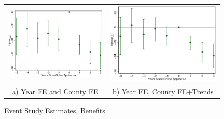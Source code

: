 \documentclass[11pt,letterpaper]{article}
\begin{document}
\begin{figure}\caption{Event Study Estimates, Benefits}
\begin{tabular}{cc}
\includegraphics[scale=0.57]{tabfig/evstu_snap_t_one_yrcf_5_3}&\includegraphics[scale=0.57]{tabfig/evstu_snap_t_one_yrcfsttr_5_3}\\
a) Year FE and County FE&b) Year FE, County FE+Trends\\

\end{tabular}
\end{figure}
\end{document}
